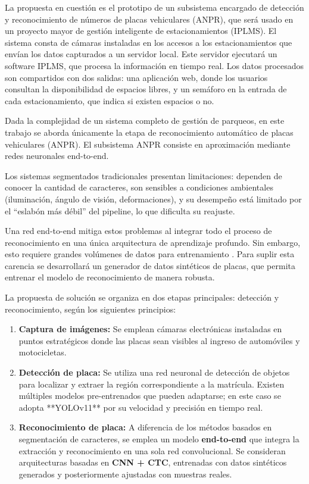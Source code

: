 La propuesta en cuestión es el prototipo de un subsistema encargado de detección y 
reconocimiento de números de placas vehiculares (ANPR),
que será usado en un proyecto mayor de gestión inteligente de estacionamientos (IPLMS).
El sistema consta de cámaras instaladas en los accesos a los estacionamientos que envían los
datos capturados a un servidor local. Este servidor ejecutará un software IPLMS, que procesa la 
información en tiempo real. 
Los datos procesados son compartidos con dos salidas: una aplicación web,
donde los usuarios consultan la disponibilidad de espacios libres,
y un semáforo en la entrada de cada estacionamiento, que indica si existen espacios o no.

Dada la complejidad de un sistema completo de gestión de parqueos,
en este trabajo se aborda únicamente la etapa de reconocimiento automático de placas vehiculares (ANPR).
El subsistema ANPR consiste en aproximación mediante redes neuronales end-to-end. 

Los sistemas segmentados tradicionales presentan limitaciones:
dependen de conocer la cantidad de caracteres,
son sensibles a condiciones ambientales (iluminación, ángulo de visión, deformaciones),
y su desempeño está limitado por el “eslabón más débil” del pipeline, lo que dificulta su reajuste.

Una red end-to-end mitiga estos problemas al integrar todo el proceso de reconocimiento 
en una única arquitectura de aprendizaje profundo. Sin embargo, esto requiere grandes volúmenes 
de datos para entrenamiento \cite{endToEndDepthwise}. Para suplir esta carencia se desarrollará 
un generador de datos sintéticos de placas, que permita entrenar el modelo de reconocimiento de manera robusta.

La propuesta de solución se organiza en dos etapas principales: detección y reconocimiento, según los siguientes principios:

\begin{enumerate}

	\item \textbf{Captura de imágenes:}
Se emplean cámaras electrónicas instaladas en puntos estratégicos donde las placas sean visibles 
al ingreso de automóviles y motocicletas.


\item \textbf{Detección de placa:}  
      Se utiliza una red neuronal de detección de objetos para localizar y extraer la región correspondiente a la matrícula.  
      Existen múltiples modelos pre-entrenados que pueden adaptarse; en este caso se adopta **YOLOv11** 
		por su velocidad y precisión en tiempo real.  

\item \textbf{Reconocimiento de placa:}  
	A diferencia de los métodos basados en segmentación de caracteres, se emplea un modelo \textbf{end-to-end} 
		que integra la extracción y reconocimiento en una sola red convolucional.  
		Se consideran arquitecturas basadas en \textbf{CNN + CTC},
		entrenadas con datos sintéticos generados y posteriormente ajustadas con muestras reales.  

\end{enumerate}

